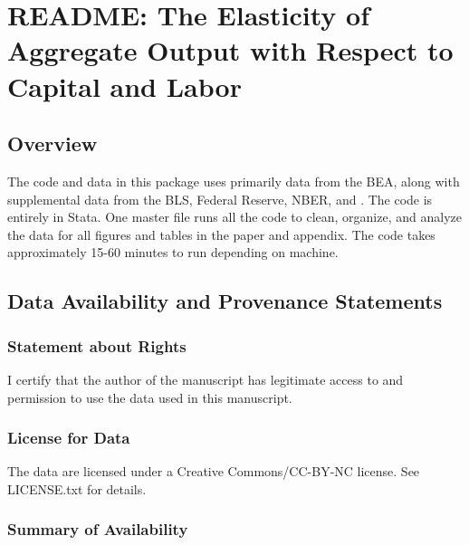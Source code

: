 \documentclass[
]{article}
\author{}
\date{}
\begin{document}
\hypertarget{template-readme-and-guidance}{%
\section{README: The Elasticity of Aggregate Output with Respect to Capital and Labor}\label{template-readme-and-guidance}}

\hypertarget{overview}{%
\subsection{Overview}\label{overview}}

The code and data in this package uses primarily data from the BEA, along with supplemental data from the BLS, Federal Reserve, NBER, and \cite{dleu2020}. The code is entirely in Stata. One master file runs all the code to clean, organize, and analyze the data for all figures and tables in the paper and appendix. The code takes approximately 15-60 minutes to run depending on machine. 

\hypertarget{data-availability-and-provenance-statements}{%
\subsection{Data Availability and Provenance
Statements}\label{data-availability-and-provenance-statements}}

\hypertarget{statement-about-rights}{%
\subsubsection{Statement about Rights}\label{statement-about-rights}}

I certify that the author of the manuscript has legitimate access to and permission to use the data used in this manuscript.

\hypertarget{optional-but-recommended-license-for-data}{%
\subsubsection{License for Data}\label{optional-but-recommended-license-for-data}}

The data are licensed under a Creative Commons/CC-BY-NC license. See LICENSE.txt for details.

\hypertarget{summary-of-availability}{%
\subsubsection{Summary of Availability}\label{summary-of-availability}}
\end{document}
